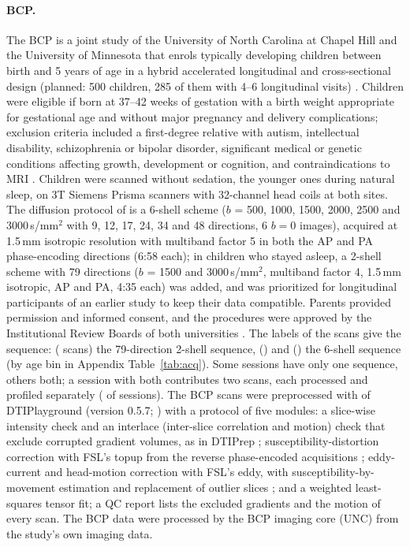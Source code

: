 \documentclass[11pt]{article}
\begin{document}
\paragraph{BCP.} The BCP is a joint study of the University of North Carolina at Chapel Hill and the University of Minnesota that enrols
typically developing children between birth and 5 years of age in a hybrid accelerated longitudinal and cross-sectional
design (planned: 500 children, 285 of them with 4--6 longitudinal visits) \citep{howell2019bcp}. Children were eligible
if born at 37--42 weeks of gestation with a birth weight appropriate for gestational age and without major pregnancy and
delivery complications; exclusion criteria included a first-degree relative with autism, intellectual disability,
schizophrenia or bipolar disorder, significant medical or genetic conditions affecting growth, development or
cognition, and contraindications to MRI \citep{howell2019bcp}. Children were scanned without sedation, the younger ones
during natural sleep, on 3T Siemens Prisma scanners with 32-channel head coils at both sites. The diffusion protocol of
\citet{howell2019bcp} is a 6-shell scheme ($b$ = 500, 1000, 1500, 2000, 2500 and 3000\,s/mm$^2$ with 9, 12, 17, 24, 34
and 48 directions, 6 $b=0$ images), acquired at 1.5\,mm isotropic resolution with multiband factor 5 in both the AP and
PA phase-encoding directions (6:58 each); in children who stayed asleep, a 2-shell scheme with 79 directions ($b$ = 1500
and 3000\,s/mm$^2$, multiband factor 4, 1.5\,mm isotropic, AP and PA, 4:35 each) was added, and was prioritized for
longitudinal participants of an earlier study to keep their data compatible. Parents provided permission and informed
consent, and the procedures were approved by the Institutional Review Boards of both universities
\citep{howell2019bcp}. The labels of the scans give the sequence: \texttt{\bcpAcqAName} (\bcpAcqAN{} scans) the 79-direction 2-shell sequence,
\texttt{\bcpAcqBName} (\bcpAcqBN{}) and \texttt{\bcpAcqCName} (\bcpAcqCN{}) the 6-shell sequence (by age bin in Appendix
Table~\ref{tab:acq}). Some sessions have only one sequence, others both; a session with both contributes two scans, each
processed and profiled separately (\bcpSessionsBoth{} of \bcpSessions{} sessions). The BCP scans were preprocessed with
 of DTIPlayground (version 0.5.7; \citealp{dtiplayground}) with a protocol of five modules: a slice-wise
intensity check and an interlace (inter-slice correlation and motion) check that exclude corrupted gradient volumes, as
in DTIPrep \citep{oguz2014dtiprep}; susceptibility-distortion correction with FSL's topup from the reverse
phase-encoded acquisitions \citep{andersson2003topup}; eddy-current and head-motion correction with FSL's eddy, with
susceptibility-by-movement estimation and replacement of outlier slices \citep{andersson2016eddy}; and a weighted
least-squares tensor fit; a QC report lists the excluded gradients and the motion of every scan. The BCP data were processed by the BCP imaging
core (UNC) from the study's own imaging data.
\end{document}
